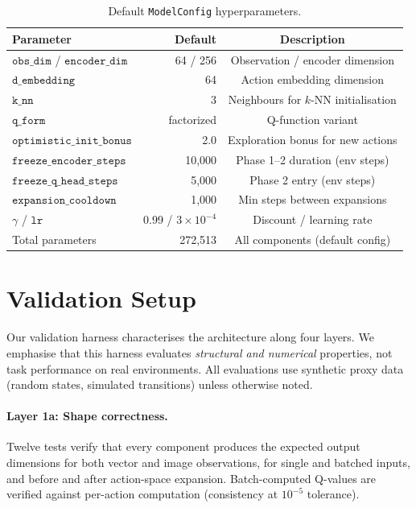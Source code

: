 \documentclass{article}
\begin{document}
\begin{table}[h]
  \centering
  \caption{Default \texttt{ModelConfig} hyperparameters.}
  \label{tab:config}
  \begin{tabular}{lrc}
    \toprule
    \textbf{Parameter} & \textbf{Default} & \textbf{Description} \\
    \midrule
    $\texttt{obs\_dim}$ / $\texttt{encoder\_dim}$ & 64 / 256 &
      Observation / encoder dimension \\
    $\texttt{d\_embedding}$ & 64 & Action embedding dimension \\
    $\texttt{k\_nn}$ & 3 & Neighbours for $k$-NN initialisation \\
    $\texttt{q\_form}$ & factorized & Q-function variant \\
    $\texttt{optimistic\_init\_bonus}$ & 2.0 & Exploration bonus for new actions \\
    $\texttt{freeze\_encoder\_steps}$ & 10{,}000 & Phase 1--2 duration (env steps) \\
    $\texttt{freeze\_q\_head\_steps}$ & 5{,}000 & Phase 2 entry (env steps) \\
    $\texttt{expansion\_cooldown}$ & 1{,}000 & Min steps between expansions \\
    $\gamma$ / $\texttt{lr}$ & 0.99 / $3\times10^{-4}$ & Discount / learning rate \\
    Total parameters & 272{,}513 & All components (default config) \\
    \bottomrule
  \end{tabular}
\end{table}


\section{Validation Setup}
\label{sec:setup}

Our validation harness characterises the architecture along four layers. We
emphasise that this harness evaluates \emph{structural and numerical}
properties, not task performance on real environments. All evaluations use
synthetic proxy data (random states, simulated transitions) unless otherwise
noted.

\paragraph{Layer 1a: Shape correctness.}
Twelve tests verify that every component produces the expected output
dimensions for both vector and image observations, for single and batched
inputs, and before and after action-space expansion. Batch-computed Q-values
are verified against per-action computation (consistency at $10^{-5}$
tolerance).
\end{document}
